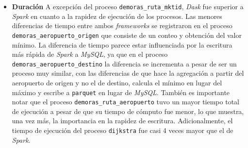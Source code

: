 \begin{itemize}
	\item \textbf{Duración} A excepción del proceso \texttt{demoras\_ruta\_mktid}, \textit{Dask} fue superior a \textit{Spark} en cuanto a la rapidez de ejecución de los procesos. Las menores diferencias de tiempo entre ambos \textit{frameworks} se registraron en el proceso \texttt{demoras\_aeropuerto\_origen} que consiste de un conteo y obtención del valor mínimo. La diferencia de tiempo parece estar influenciada por la escritura más rápida de \textit{Spark} a \textit{MySQL}, ya que en el proceso \texttt{demoras\_aeropuerto\_destino} la diferencia se incrementa a pesar de ser un proceso muy similar, con las diferencias de que hace la agregación a partir del aeropuerto de origen y no el de destino, calcula el mínimo en lugar del máximo y escribe a \texttt{parquet} en lugar de \textit{MySQL}. También es importante notar que el proceso \texttt{demoras\_ruta\_aeropuerto} tuvo un mayor tiempo total de ejecución a pesar de que su tiempo de cómputo fue menor, lo que muestra, una vez más, la importancia en la rapidez de escritura. Adicionalmente, el tiempo de ejecución del proceso \texttt{dijkstra} fue casi 4 veces mayor que el de \textit{Spark}.


\end{itemize}

